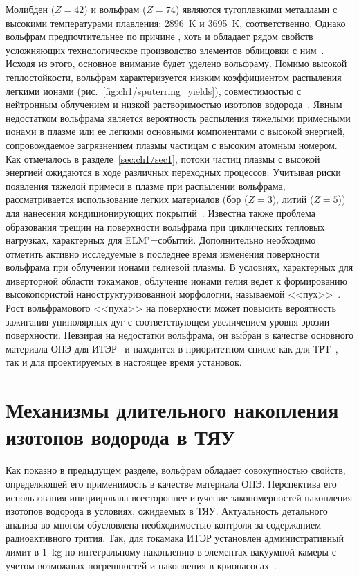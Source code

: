 Молибден ($Z=42$) и вольфрам ($Z=74$) являются тугоплавкими металлами с высокими температурами плавления: \SI{2896}{\kelvin} и \SI{3695}{\kelvin}, соответственно. Однако вольфрам предпочтительнее по причине , хоть и обладает рядом свойств усложняющих технологическое производство элементов облицовки с ним~\cite{Piskarev2024}. Исходя из этого, основное внимание будет уделено вольфраму. Помимо высокой теплостойкости, вольфрам характеризуется низким коэффициентом распыления легкими ионами (рис.~\cref{fig:ch1/sputerring_yields}), совместимостью с нейтронным облучением и низкой растворимостью изотопов водорода~\cite{Roth2011, Pintsuk2012,Rieth2019}. Явным недостатком вольфрама является вероятность распыления тяжелыми примесными ионами в плазме или ее легкими основными компонентами с высокой энергией, сопровождаемое загрязнением плазмы частицам с высоким атомным номером. Как отмечалось в разделе~\cref{sec:ch1/sec1}, потоки частиц плазмы с высокой энергией ожидаются в ходе различных переходных процессов. Учитывая риски появления тяжелой примеси в плазме при распылении вольфрама, рассматривается использование легких материалов (бор ($Z=3$), литий ($Z=5$)) для нанесения кондиционирующих покрытий~\cite{Winter1996,Wauters2020}. Известна также проблема образования трещин на поверхности вольфрама при циклических тепловых нагрузках, характерных для ELM"=событий. Дополнительно необходимо отметить активно исследуемые в последнее время изменения поверхности вольфрама при облучении ионами гелиевой плазмы. В условиях, характерных для диверторной области токамаков, облучение ионами гелия ведет к формированию высокопористой наноструктуризованной морфологии, называемой <<пух>>~\cite{Ueda2018,Kajita2018,Fedorovich2019,hammond2017helium,Kajita2020,Wright2022}. Рост вольфрамового <<пуха>> на поверхности может повысить вероятность зажигания униполярных дуг с соответствующем увеличением уровня эрозии поверхности. Невзирая на недостатки вольфрама, он выбран в качестве основного материала ОПЭ для ИТЭР~\cite{Pitts2025} и находится в приоритетном списке как для ТРТ~\cite{Piskarev2024}, так и для проектируемых в настоящее время установок. 

\section{Механизмы длительного накопления изотопов водорода в ТЯУ}\label{sec:ch1/sec3}
Как показно в предыдущем разделе, вольфрам обладает совокупностью свойств, определяющей его применимость в качестве материала ОПЭ. Перспектива его использования инициировала всестороннее изучение закономерностей накопления изотопов водорода в условиях, ожидаемых в ТЯУ. Актуальность детального анализа во многом обусловлена необходимостью контроля за содержанием радиоактивного трития. Так, для токамака ИТЭР установлен административный лимит в \SI{1}{\kilogram} по интегральному накоплению в элементах вакуумной камеры с учетом возможных погрешностей и накопления в крионасосах~\cite{Roth1}.

